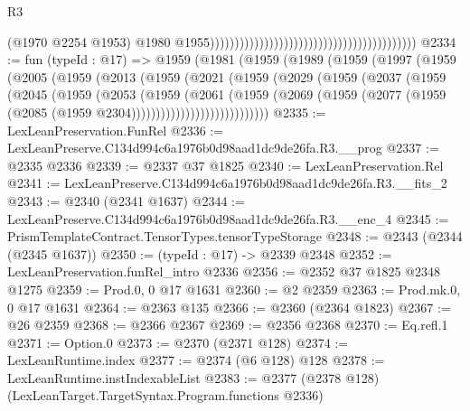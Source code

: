 \begin{lexlean}{R3}
\begin{coremodule}
                                                                                        (@1970
                                                                                          @2254
                                                                                          @1953)
                                                                                        @1980
                                                                                        @1955))))))))))))))))))))))))))))))))))))))))))
@2334 := fun (typeId : @17) =>
  @1959
    (@1981
      (@1959
        (@1989
          (@1959
            (@1997
              (@1959
                (@2005
                  (@1959
                    (@2013
                      (@1959
                        (@2021
                          (@1959
                            (@2029
                              (@1959
                                (@2037
                                  (@1959
                                    (@2045
                                      (@1959
                                        (@2053
                                          (@1959
                                            (@2061
                                              (@1959
                                                (@2069
                                                  (@1959
                                                    (@2077
                                                      (@1959
                                                        (@2085
                                                          (@1959 @2304))))))))))))))))))))))))))))
@2335 := LexLeanPreservation.FunRel
@2336 := LexLeanPreserve.C134d994c6a1976b0d98aad1dc9de26fa.R3.__prog
@2337 := @2335 @2336
@2339 := @2337 @37 @1825
@2340 := LexLeanPreservation.Rel
@2341 := LexLeanPreserve.C134d994c6a1976b0d98aad1dc9de26fa.R3.__fits_2
@2343 := @2340 (@2341 @1637)
@2344 := LexLeanPreserve.C134d994c6a1976b0d98aad1dc9de26fa.R3.__enc_4
@2345 := PrismTemplateContract.TensorTypes.tensorTypeStorage
@2348 := @2343 (@2344 (@2345 @1637))
@2350 := (typeId : @17) -> @2339 @2348
@2352 := LexLeanPreservation.funRel_intro @2336
@2356 := @2352 @37 @1825 @2348 @1275
@2359 := Prod.{0, 0} @17 @1631
@2360 := @2 @2359
@2363 := Prod.mk.{0, 0} @17 @1631
@2364 := @2363 @135
@2366 := @2360 (@2364 @1823)
@2367 := @26 @2359
@2368 := @2366 @2367
@2369 := @2356 @2368
@2370 := Eq.refl.{1}
@2371 := Option.{0}
@2373 := @2370 (@2371 @128)
@2374 := LexLeanRuntime.index
@2377 := @2374 (@6 @128) @128
@2378 := LexLeanRuntime.instIndexableList
@2383 := @2377 (@2378 @128) (LexLeanTarget.TargetSyntax.Program.functions @2336)

\end{coremodule}
\end{lexlean}
